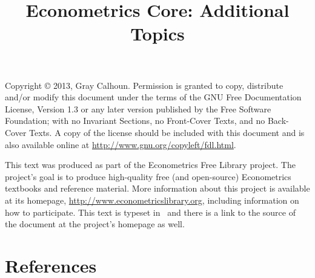 \documentclass[nofonts]{tufte-latex/tufte-handout}
\title{Econometrics Core: Additional Topics}
\begin{document}
\maketitle

\bigskip\noindent%
Copyright © 2013, Gray Calhoun.  Permission is granted to copy,
distribute and/or modify this document under the terms of the GNU Free
Documentation License, Version 1.3 or any later version published by
the Free Software Foundation; with no Invariant Sections, no
Front-Cover Texts, and no Back-Cover Texts.  A copy of the license
should be included with this document and is also available online at
\url{http://www.gnu.org/copyleft/fdl.html}.

This text was produced as part of the Econometrics Free Library
project.  The project's goal is to produce high-quality free (and
open-source) Econometrics textbooks and reference material.  More
information about this project is available at its homepage,
\url{http://www.econometricslibrary.org}, including information on how
to participate.  This text is typeset in \XeLaTeX\ and there is a link
to the source of the document at the project's homepage as well.

%
\tableofcontents







\part*{References}%

\end{document}
